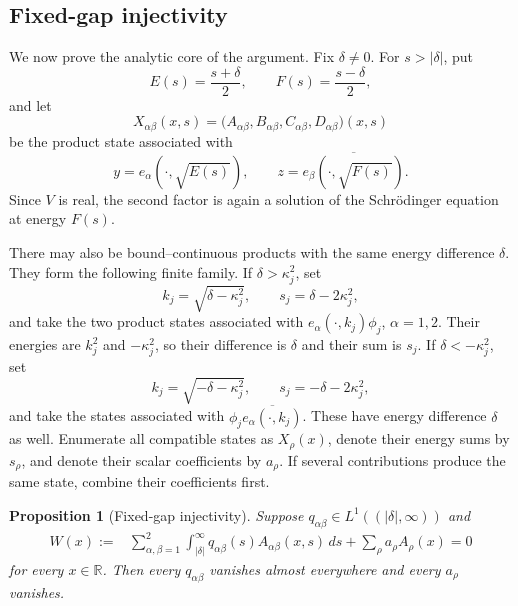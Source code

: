 \documentclass[11pt]{amsart}
\newtheorem{proposition}[theorem]{Proposition}
\numberwithin{equation}{section}
\theoremstyle{remark}
\newcommand{\R}{\mathbb R}
\begin{document}
\subsection{Fixed-gap injectivity}

We now prove the analytic core of the argument.  Fix $\delta\ne0$.  For
$s>|\delta|$, put
\[
 E(s)=\frac{s+\delta}{2},
 \qquad
 F(s)=\frac{s-\delta}{2},
\]
and let
\[
 X_{\alpha\beta}(x,s)
 =\bigl(A_{\alpha\beta},B_{\alpha\beta},
        C_{\alpha\beta},D_{\alpha\beta}\bigr)(x,s)
\]
be the product state associated with
\[
 y=e_\alpha(\cdot,\sqrt{E(s)}),
 \qquad
 z=\overline{e_\beta(\cdot,\sqrt{F(s)})}.
\]
Since $V$ is real, the second factor is again a solution of the Schr\"odinger
equation at energy $F(s)$.

There may also be bound--continuous products with the same energy difference
$\delta$.  They form the following finite family.  If $\delta>\kappa_j^2$, set
\[
 k_j=\sqrt{\delta-\kappa_j^2},
 \qquad s_j=\delta-2\kappa_j^2,
\]
and take the two product states associated with
$e_\alpha(\cdot,k_j)\phi_j$, $\alpha=1,2$.  Their energies are
$k_j^2$ and $-\kappa_j^2$, so their difference is $\delta$ and their sum is
$s_j$.  If $\delta<-\kappa_j^2$, set
\[
 k_j=\sqrt{-\delta-\kappa_j^2},
 \qquad s_j=-\delta-2\kappa_j^2,
\]
and take the states associated with
$\phi_j\overline{e_\alpha(\cdot,k_j)}$.  These have energy difference
$\delta$ as well.  Enumerate all compatible states as $X_\rho(x)$, denote
their energy sums by $s_\rho$, and denote their scalar coefficients by
$a_\rho$.  If several contributions produce the same state, combine their
coefficients first.

\begin{proposition}[Fixed-gap injectivity]\label{prop:fixed-gap}
Suppose $q_{\alpha\beta}\in L^1((|\delta|,\infty))$ and
\begin{align}
 W(x)
 :={}&\sum_{\alpha,\beta=1}^2
 \int_{|\delta|}^\infty
 q_{\alpha\beta}(s)A_{\alpha\beta}(x,s)\,ds
 +\sum_\rho a_\rho A_\rho(x)
 =0
 \label{eq:fixed-gap-relation}
\end{align}
for every $x\in\R$.  Then every $q_{\alpha\beta}$ vanishes almost everywhere
and every $a_\rho$ vanishes.
\end{proposition}
\end{document}
